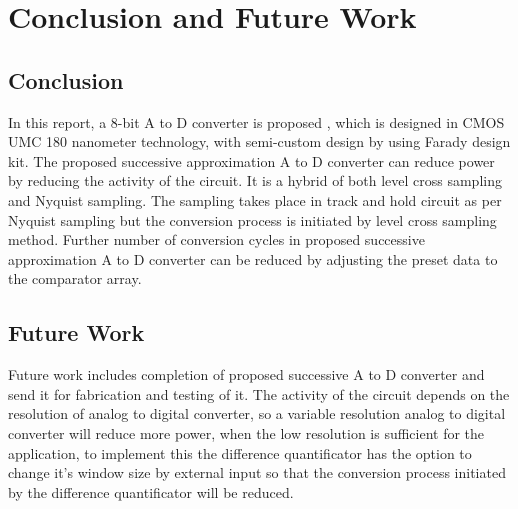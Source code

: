 \chapter{Conclusion and Future Work}


\section{Conclusion}

\par
\hspace{1.2cm} In this report, a 8-bit A to D converter is proposed , which is designed in CMOS UMC 180 nanometer technology, with semi-custom design by using Farady design kit. The proposed successive approximation A to D converter can reduce power by reducing the activity of the circuit. It is a hybrid of both level cross sampling and Nyquist sampling. The sampling takes place in track and hold circuit as per Nyquist sampling but the conversion process is initiated by level cross sampling method. Further number of conversion cycles in proposed successive approximation A to D converter can be reduced by adjusting the preset data to the comparator array.


\section{Future Work}

\par
\hspace{1.2cm} Future work includes completion of proposed successive A to D converter and send it for fabrication and testing of it. The activity of the circuit depends on the resolution of analog to digital converter, so a variable resolution analog to digital converter will reduce more power, when the low resolution is sufficient for the application, to implement this the difference quantificator has the option to change it's window size by external input so that the conversion process initiated by the difference quantificator will be reduced. 



